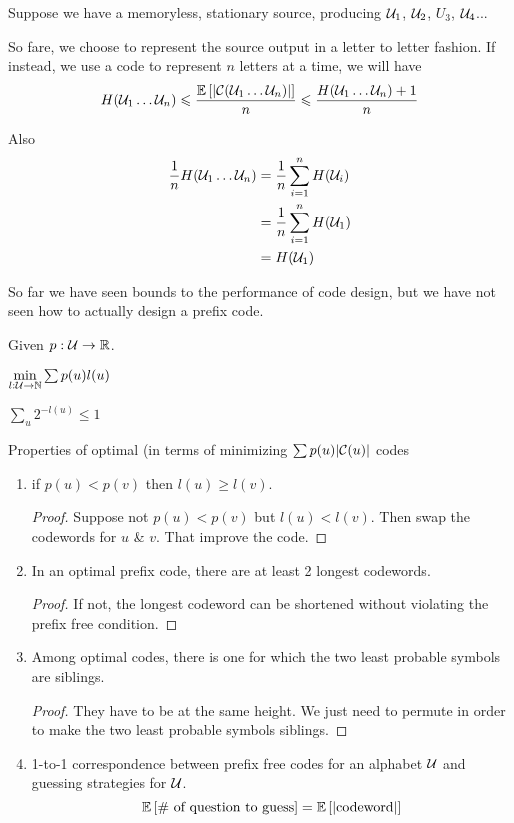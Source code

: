 Suppose we have a memoryless, stationary source, producing $\mathcal{U}_1$, $\mathcal{U}_2$, $U_3$, $\mathcal{U}_4$...

So fare, we choose to represent the source output in a letter to letter fashion. If instead, we use a code to represent $n$ letters at a time, we will have
\[
    H(\mathcal{U}_1\ldots \mathcal{U}_n) \leqslant \frac{\mathbb{E}\left[ \left\lvert \mathcal{C}(\mathcal{U}_1\ldots \mathcal{U}_n)\right\rvert \right]}{n} \leqslant \frac{H(\mathcal{U}_1\ldots \mathcal{U}_n) +1}{n}
\]

Also
\[
    \begin{aligned}
        \frac{1}{n}H(\mathcal{U}_1\ldots \mathcal{U}_n) &= \frac{1}{n} \sum\limits_{i=1}^n H(\mathcal{U}_i)\\
        &= \frac{1}{n}\sum\limits_{i=1}^n H(\mathcal{U}_1)\\
        &= H(\mathcal{U}_1)
    \end{aligned}
\]

So far we have seen bounds to the performance of code design, but we have not seen how to actually design a prefix code.

Given $p:\mathcal{U} \to \mathbb{R}$. 

$\min\limits_{l:\mathcal{U}\to\mathbb{N}} \sum p(u) l(u)$ 

$\sum\limits_u 2^{-l(u)} \leqslant 1$

Properties of optimal (in terms of minimizing $\sum p(u) \lvert\mathcal{C}(u)\rvert$ codes

\begin{enumerate}
    \item if $p(u) < p(v)$ then $l(u) \geqslant l(v)$.
        \begin{proof}
            Suppose not $p(u) < p(v)$ but $l(u) < l(v)$. Then swap the codewords for $u$ \& $v$. That improve the code.
        \end{proof}
        
    \item In an optimal prefix code, there are at least 2 longest codewords.
        \begin{proof}
            If not, the longest codeword can be shortened without violating the prefix free condition.
        \end{proof}
        
    \item Among optimal codes, there is one for which the two least probable symbols are siblings.
        \begin{proof}
            They have to be at the same height. We just need to permute in order to make the two least probable symbols siblings.
        \end{proof}
        
    \item 1-to-1 correspondence between prefix free codes for an alphabet $\mathcal{U}$ and guessing strategies for $\mathcal{U}$.
        \[
            \mathbb{E}\left[ \#\text{ of question to guess} \right] = \mathbb{E}\left[ \lvert \text{codeword} \rvert \right]
        \]
\end{enumerate}

